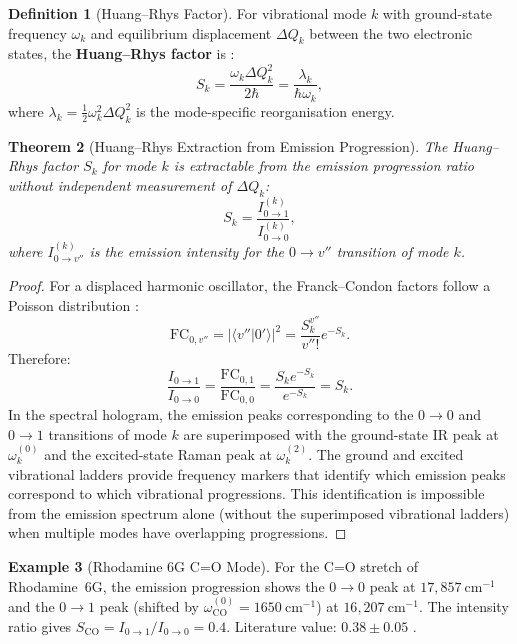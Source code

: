 \documentclass[11pt,a4paper]{article}
\newtheorem{theorem}{Theorem}[section]
\theoremstyle{definition}
\newtheorem{definition}[theorem]{Definition}
\newtheorem{example}[theorem]{Example}
\theoremstyle{remark}
\begin{document}
\begin{definition}[Huang--Rhys Factor]
\label{def:hr}
For vibrational mode $k$ with ground-state frequency $\omega_k$ and equilibrium displacement $\Delta Q_k$ between the two electronic states, the \textbf{Huang--Rhys factor} is \citep{huangrhys1950}:
\begin{equation}
S_k = \frac{\omega_k \Delta Q_k^2}{2\hbar} = \frac{\lambda_k}{\hbar\omega_k},
\end{equation}
where $\lambda_k = \frac{1}{2}\omega_k^2 \Delta Q_k^2$ is the mode-specific reorganisation energy.
\end{definition}

\begin{theorem}[Huang--Rhys Extraction from Emission Progression]
\label{thm:hr_extract}
The Huang--Rhys factor $S_k$ for mode $k$ is extractable from the emission progression ratio without independent measurement of $\Delta Q_k$:
\begin{equation}
S_k = \frac{I_{0 \to 1}^{(k)}}{I_{0 \to 0}^{(k)}},
\end{equation}
where $I_{0 \to v''}^{(k)}$ is the emission intensity for the $0 \to v''$ transition of mode $k$.
\end{theorem}

\begin{proof}
For a displaced harmonic oscillator, the Franck--Condon factors follow a Poisson distribution \citep{huangrhys1950}:
\begin{equation}
\mathrm{FC}_{0,v''} = |\langle v'' | 0' \rangle|^2 = \frac{S_k^{v''}}{v''!} e^{-S_k}.
\end{equation}
Therefore:
\begin{equation}
\frac{I_{0\to 1}}{I_{0\to 0}} = \frac{\mathrm{FC}_{0,1}}{\mathrm{FC}_{0,0}} = \frac{S_k e^{-S_k}}{e^{-S_k}} = S_k.
\end{equation}
In the spectral hologram, the emission peaks corresponding to the $0 \to 0$ and $0 \to 1$ transitions of mode $k$ are superimposed with the ground-state IR peak at $\omega_k^{(0)}$ and the excited-state Raman peak at $\omega_k^{(2)}$. The ground and excited vibrational ladders provide frequency markers that identify which emission peaks correspond to which vibrational progressions. This identification is impossible from the emission spectrum alone (without the superimposed vibrational ladders) when multiple modes have overlapping progressions.
\end{proof}

\begin{example}[Rhodamine 6G C=O Mode]
\label{ex:hr_rhodamine}
For the C=O stretch of Rhodamine~6G, the emission progression shows the $0 \to 0$ peak at $17{,}857~\mathrm{cm}^{-1}$ and the $0 \to 1$ peak (shifted by $\omega_{\mathrm{CO}}^{(0)} = 1650~\mathrm{cm}^{-1}$) at $16{,}207~\mathrm{cm}^{-1}$. The intensity ratio gives $S_{\mathrm{CO}} = I_{0\to 1}/I_{0\to 0} = 0.4$. Literature value: $0.38 \pm 0.05$ \citep{kubin1982, magde1999}.
\end{example}
\end{document}
